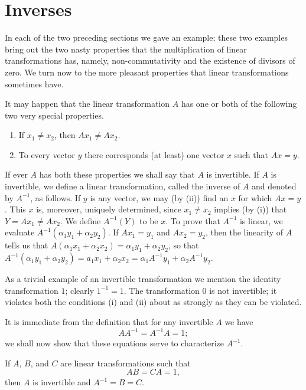\section{Inverses}

In each of the two preceding sections we gave an example; these two examples
bring out the two nasty properties that the multiplication of linear
transformations has, namely, non-commutativity and the existence of divisors of
zero. We turn now to the more pleasant properties that linear transformations
sometimes have.

It may happen that the linear transformation \(A\) has one or both of the following two very special properties.
\begin{enumerate}[wide, nosep, label=(\roman*)]
    \item If \(x_1 \neq x_2\), then \(Ax_1 \neq Ax_2\).
    \item To every vector \(y\) there corresponds (at least) one vector \(x\) such that \(Ax = y\).
\end{enumerate}

If ever \(A\) has both these properties we shall say that \(A\) is invertible. If \(A\) is invertible, we define a linear transformation, called the inverse of \(A\) and denoted by \(A^{-1}\), as follows. If \(y\) is any vector, we may (by (ii)) find an \(x\) for which \(Ax = y\). This \(x\) is, moreover, uniquely determined, since \(x_1 \neq x_2\) implies (by (i)) that \(Y = Ax_1 \neq Ax_2\). We define \(A^{-1}(Y)\) to be \(x\). To prove that \(A^{-1}\) is linear, we evaluate \(A^{-1}(\alpha_1y_1 + \alpha_2y_2)\). If \(Ax_1 = y_1\) and \(Ax_2 = y_2\), then the linearity of \(A\) tells us that \(A(\alpha_1x_1 + \alpha_2x_2) = \alpha_1y_1 + \alpha_2y_2\), so that \(A^{-1}(\alpha_1y_1 + \alpha_2y_2) = a_1x_1 + \alpha_2x_2 = \alpha_1A^{-1}y_1 + \alpha_2A^{-1}y_2\).

As a trivial example of an invertible transformation we mention the identity transformation \(1\); clearly \(1^{-1} = 1\). The transformation \(0\) is not invertible; it violates both the conditions (i) and (ii) about as strongly as they can be violated.

It is immediate from the definition that for any invertible \(A\) we have
\begin{equation*}
    AA^{-1} = A^{-1}A = 1;
\end{equation*}
we shall now show that these equations serve to characterize \(A^{-1}\).

\begin{theorem}
    If \(A\), \(B\), and \(C\) are linear transformations such that
    \begin{equation*}
        AB = CA = 1,
    \end{equation*}
    then \(A\) is invertible and \(A^{-1} = B = C\).
\end{theorem}

